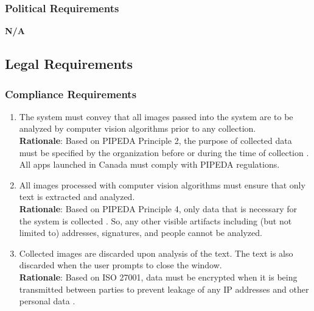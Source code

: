\subsubsection{Political Requirements}
\label{ssub:political_requirements}
\textbf{N/A}


\subsection{Legal Requirements}
\label{sub:legal_requirements}

\subsubsection{Compliance Requirements}
\label{ssub:compliance_requirements}
\begin{enumerate}[{LR-COMP}1. ]
	\item The system must convey that all images passed into the system are to be analyzed by computer vision algorithms prior to any collection.
	\\ \textbf{Rationale}: Based on PIPEDA Principle 2, the purpose of collected data must be specified by the organization before or during the time of collection \cite{PIPEDA2025}. All apps launched in Canada must comply with PIPEDA regulations.
	\item All images processed with computer vision algorithms must ensure that only text is extracted and analyzed.
	\\ \textbf{Rationale}: Based on PIPEDA Principle 4, only data that is necessary for the system is collected \cite{PIPEDA2025}. So, any other visible artifacts including (but not limited to) addresses, signatures, and people cannot be analyzed.
	\item Collected images are discarded upon analysis of the text. The text is also discarded when the user prompts to close the window.
	\\ \textbf{Rationale}: Based on ISO 27001, data must be encrypted when it is being transmitted between parties to prevent leakage of any IP addresses and other personal data \cite{ISMS2025}.
\end{enumerate}

